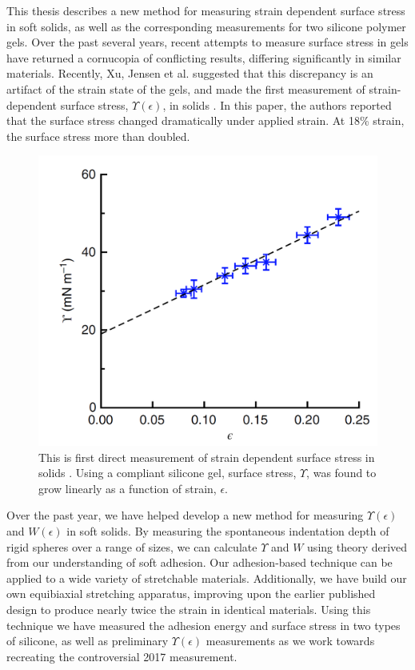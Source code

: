 This thesis describes a new method for measuring strain dependent surface stress in soft solids, as well as the corresponding measurements for two silicone polymer gels. Over the past several years, recent attempts to measure surface stress in gels have returned a cornucopia of conflicting results, differing significantly in similar materials. Recently, Xu, Jensen et al. suggested that this discrepancy is an artifact of the strain state of the gels, and made the first measurement of strain-dependent surface stress, $\Upsilon(\epsilon)$, in solids \cite{xu2017direct}. In this paper, the authors reported that the surface stress changed dramatically under applied strain. At 18\% strain, the surface stress more than doubled. 
\begin{figure}[h!]
	\centering
	\includegraphics[width=0.7\linewidth]{Chapters/Figures/2017natcomfig}
	\caption[Surface Stress vs. Strain in Silicone]{This is first direct measurement of strain dependent surface stress in solids \cite{xu2017direct}. Using a compliant silicone gel, surface stress, $\Upsilon$, was found to grow linearly as a function of strain, $ \epsilon $.}
	\label{fig:2017natcomfig}
\end{figure}

Over the past year, we have helped develop a new method for measuring $\Upsilon(\epsilon)$ and $ W(\epsilon) $ in soft solids. By measuring the spontaneous indentation depth of rigid spheres over a range of sizes, we can calculate $ \Upsilon $ and $ W $ using theory derived from our understanding of soft adhesion. Our adhesion-based technique can be applied to a wide variety of stretchable materials. Additionally, we have build our own equibiaxial stretching apparatus, improving upon the earlier published design \cite{xu2017direct} to produce nearly twice the strain in identical materials. Using this technique we have measured the adhesion energy and surface stress in two types of silicone, as well as preliminary $ \Upsilon(\epsilon) $ measurements as we work towards recreating the controversial 2017 measurement.


